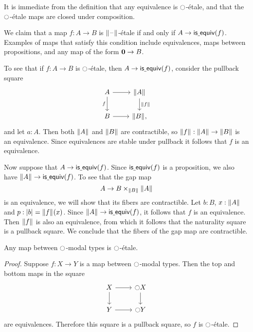 \documentclass[9pt,twosided]{amsart}
\begin{document}
It is immediate from the definition that any equivalence is ${\ocircle}$-\'etale, and that the ${\ocircle}$-\'etale maps are closed under composition.

\begin{eg}\label{eg:etale_prop}
We claim that a map $f:A\to B$ is $\brck{\blank}$-\'etale if and only if $A\to \mathsf{is\underline{\ }{}equiv}(f)$. Examples of maps that satisfy this condition include equivalences, maps between propositions, and any map of the form $\mathbf{0}\to B$.

To see that if $f:A\to B$ is ${\ocircle}$-\'etale, then $A\to\mathsf{is\underline{\ }{}equiv}(f)$, consider the pullback square
\begin{equation*}
\begin{tikzcd}
A \arrow[r] \arrow[d,swap,"f"] & \brck{A} \arrow[d,"\brck{f}"] \\
B \arrow[r] & \brck{B},
\end{tikzcd}
\end{equation*}
and let $a:A$. Then both $\brck{A}$ and $\brck{B}$ are contractible, so $\brck{f}:\brck{A}\to\brck{B}$ is an equivalence. Since equivalences are stable under pullback it follows that $f$ is an equivalence.

Now suppose that $A\to \mathsf{is\underline{\ }{}equiv}(f)$. Since $\mathsf{is\underline{\ }{}equiv}(f)$ is a proposition, we also have $\brck{A}\to\isequiv(f)$. To see that the gap map
\begin{equation*}
A \to B\times_{\brck{B}}\brck{A}
\end{equation*}
is an equivalence, we will show that its fibers are contractible. Let $b:B$, $x:\brck{A}$ and $p:\bproj{b}=\brck{f}(x)$. Since $\brck{A}\to\isequiv(f)$, it follows that $f$ is an equivalence. Then $\brck{f}$ is also an equivalence, from which it follows that the naturality square is a pullback square. We conclude that the fibers of the gap map are contractible. 
\end{eg}

\begin{lem}\label{lem:etale_modal}
Any map between ${\ocircle}$-modal types is ${\ocircle}$-\'etale.
\end{lem}

\begin{proof}
Suppose $f:X\to Y$ is a map between ${\ocircle}$-modal types. Then the top and bottom maps in the square
\begin{equation*}
\begin{tikzcd}
X \arrow[r] \arrow[d] & \modal X \arrow[d] \\
Y \arrow[r] & \modal Y
\end{tikzcd}
\end{equation*}
are equivalences. Therefore this square is a pullback square, so $f$ is ${\ocircle}$-\'etale.
\end{proof}
\end{document}

